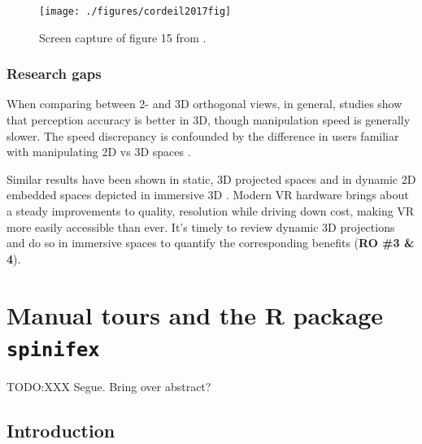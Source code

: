 \documentclass{monashthesis}
\begin{document}
\begin{figure}

{\centering \texttt{[image: ./figures/cordeil2017fig]} 

}

\caption{Screen capture of figure 15 from \textcite{cordeil_imaxes:_2017}.}\label{fig:cordeil2017fig}
\end{figure}

\hypertarget{research-gaps-1}{%
\subsection{Research gaps}\label{research-gaps-1}}

When comparing between 2- and 3D orthogonal views, in general, studies show that perception accuracy is better in 3D, though manipulation speed is generally slower. The speed discrepancy is confounded by the difference in users familiar with manipulating 2D vs 3D spaces \autocites{lee_effects_1986,wickens_implications_1994,tory_visualization_2006}[counterexample][]{sedlmair_empirical_2013}.

Similar results have been shown in static, 3D projected spaces \autocite{gracia_new_2016,wagner_filho_immersive_2018} and in dynamic 2D embedded spaces depicted in immersive 3D \autocite{nelson_xgobi_1998}. Modern VR hardware brings about a steady improvements to quality, resolution while driving down cost, making VR more easily accessible than ever. It's timely to review dynamic 3D projections and do so in immersive spaces to quantify the corresponding benefits (\textbf{RO \#3 \& 4}).

\hypertarget{ch:spinifex}{%
\chapter{\texorpdfstring{Manual tours and the R package \texttt{spinifex}}{Manual tours and the R package spinifex}}\label{ch:spinifex}}

TODO:XXX Segue. Bring over abstract?

\hypertarget{introduction}{%
\section{Introduction}\label{introduction}}
\end{document}
